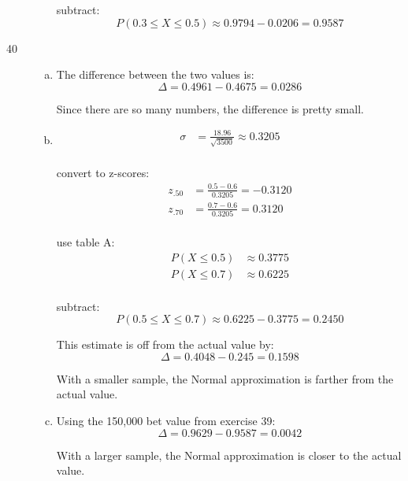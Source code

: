 \documentclass[letterpaper, landscape]{exam}
\begin{document}
\begin{description}
\begin{enumerate}[(a)]
            subtract:
            \[
              P(0.3 \leq X \leq 0.5) \approx 0.9794 - 0.0206 = \boxed{ 0.9587 }
            \]

        \end{enumerate}

      \newpage

      \item[40]
        \begin{enumerate}[(a)]
          \item The difference between the two values is:
            \[
              \Delta = 0.4961 - 0.4675 = \boxed{ 0.0286 }
            \]

            Since there are so many numbers, the difference is pretty small.

          \item
            \begin{align*}
              \sigma &= \frac{18.96}{\sqrt{3500}} \approx 0.3205 \\
            \end{align*}
            
            convert to z-scores:
            \begin{align*}
              z_{.50} &= \frac{0.5 - 0.6}{0.3205} = -0.3120 \\
              z_{.70} &= \frac{0.7 - 0.6}{0.3205} = 0.3120 \\
            \end{align*}

            use table A:
            \begin{align*}
              P(X \leq 0.5) & \approx 0.3775 \\
              P(X \leq 0.7) & \approx 0.6225 \\
            \end{align*}

            subtract:
            \[
              P(0.5 \leq X \leq 0.7) \approx 0.6225 - 0.3775 = 0.2450
            \]

            This estimate is off from the actual value by:
            \[
              \Delta = 0.4048 - 0.245 = \boxed{ 0.1598 }
            \]

            With a smaller sample, the Normal approximation is farther from the
            actual value.
            
          \item Using the 150,000 bet value from exercise 39:
            \[
              \Delta = 0.9629 - 0.9587 = \boxed{ 0.0042 }
            \]

            With a larger sample, the Normal approximation is closer to the
            actual value.

        \end{enumerate}
  \end{description}
\end{document}
